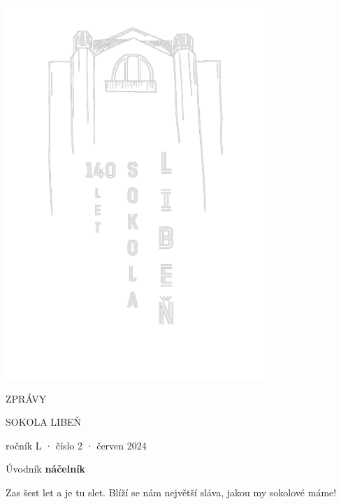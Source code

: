 \documentclass[11pt]{article}
\begin{document}
\pagecolor{sokolred}
\color{white}
\begin{center}

\vspace*{\fill}

\includegraphics*[width=0.75\textwidth]{logo-140-vert-white.pdf}

{\titlesize \fugner ZPRÁVY}

{\titlesize \tyrs SOKOLA LIBEŇ}

\vspace*{1cm}

{\large ročník L · číslo 2 · červen 2024}

\vspace*{\fill}
\end{center}

\clearpage
\normalcolor
\nopagecolor
{}

\pagestyle{uvodnik}


{\fontsize{48pt}{57pt} \fugner \color{sokolred} \noindent Úvodník}
\hfill
{\textbf{náčelník}} %


\vspace*{12pt}

Zas šest let a je tu slet. Blíží se nám největší sláva, jakou my sokolové máme!
\end{document}
